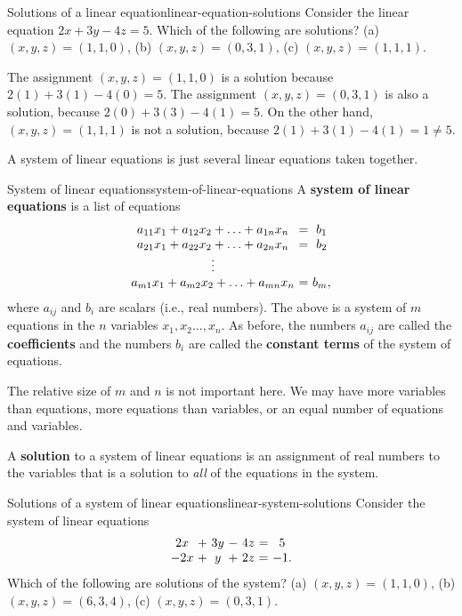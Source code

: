 \begin{example}{Solutions of a linear equation}{linear-equation-solutions}
  Consider the linear equation $2x+3y-4z=5$. Which of the following
  are solutions? (a) $(x,y,z)=(1,1,0)$, (b) $(x,y,z)=(0,3,1)$, (c)
  $(x,y,z)=(1,1,1)$.
\end{example}

\begin{solution}
  The assignment $(x,y,z) = (1,1,0)$ is a solution because
  $2(1)+3(1)-4(0) = 5$. The assignment $(x,y,z) = (0,3,1)$ is also a
  solution, because $2(0) + 3(3) - 4(1) = 5$. On the other hand,
  $(x,y,z) = (1,1,1)$ is not a solution, because
  $2(1) + 3(1)-4(1) = 1 \neq 5$.
\end{solution}

A system of linear equations is just several linear equations taken
together.

\begin{definition}{System of linear equations}{system-of-linear-equations}
  A \textbf{system of linear equations}%
   is a list of equations
  \begin{equation*}
    \begin{array}{c@{~}c@{~}c}
      a_{11}x_1+a_{12}x_2+\ldots+a_{1n}x_n&=&b_1 \\
      a_{21}x_1+a_{22}x_2+\ldots+a_{2n}x_n&=&b_2 \\
      \vdots \\
      a_{m1}x_1+a_{m2}x_2+\ldots+a_{mn}x_n&=&b_m,
    \end{array}
  \end{equation*}
  where $a_{ij}$ and $b_i$ are scalars (i.e., real numbers). The above
  is a system of $m$ equations in the $n$ variables
  $x_1,x_2\ldots,x_n$.  As before, the numbers $a_{ij}$ are called the
  \textbf{coefficients}%
   and the numbers $b_i$ are called the
  \textbf{constant terms}%
   of the system of equations.
\end{definition}

The relative size of $m$ and $n$ is not important here. We may have
more variables than equations, more equations than variables, or an
equal number of equations and variables.

A \textbf{solution}%
 to a system of linear
equations is an assignment of real numbers to the variables that is a
solution to {\em all} of the equations in the system.

\begin{example}{Solutions of a system of linear equations}{linear-system-solutions}
  Consider the system of linear equations
  \begin{equation*}
    \begin{array}{c@{~}c@{~}c@{~}c@{~}c@{~}c@{~}c}
      2x&+&3y&-&4z &=& 5 \\
      -2x&+&y&+&2z &=& -1.
    \end{array}
  \end{equation*}
  Which of the following are solutions of the system? (a)
  $(x,y,z)=(1,1,0)$, (b) $(x,y,z)=(6,3,4)$, (c) $(x,y,z)=(0,3,1)$.
\end{example}

